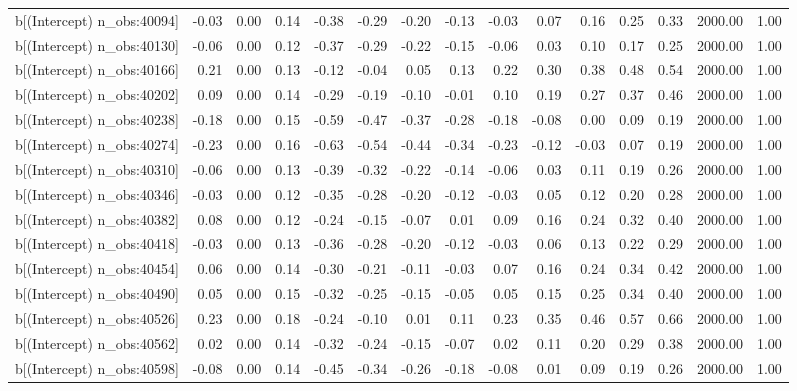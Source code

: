 \begin{table}[ht]
\begin{tabular}{rrrrrrrrrrrrrrr}
  b[(Intercept) n\_obs:40094] & -0.03 & 0.00 & 0.14 & -0.38 & -0.29 & -0.20 & -0.13 & -0.03 & 0.07 & 0.16 & 0.25 & 0.33 & 2000.00 & 1.00 \\ 
  b[(Intercept) n\_obs:40130] & -0.06 & 0.00 & 0.12 & -0.37 & -0.29 & -0.22 & -0.15 & -0.06 & 0.03 & 0.10 & 0.17 & 0.25 & 2000.00 & 1.00 \\ 
  b[(Intercept) n\_obs:40166] & 0.21 & 0.00 & 0.13 & -0.12 & -0.04 & 0.05 & 0.13 & 0.22 & 0.30 & 0.38 & 0.48 & 0.54 & 2000.00 & 1.00 \\ 
  b[(Intercept) n\_obs:40202] & 0.09 & 0.00 & 0.14 & -0.29 & -0.19 & -0.10 & -0.01 & 0.10 & 0.19 & 0.27 & 0.37 & 0.46 & 2000.00 & 1.00 \\ 
  b[(Intercept) n\_obs:40238] & -0.18 & 0.00 & 0.15 & -0.59 & -0.47 & -0.37 & -0.28 & -0.18 & -0.08 & 0.00 & 0.09 & 0.19 & 2000.00 & 1.00 \\ 
  b[(Intercept) n\_obs:40274] & -0.23 & 0.00 & 0.16 & -0.63 & -0.54 & -0.44 & -0.34 & -0.23 & -0.12 & -0.03 & 0.07 & 0.19 & 2000.00 & 1.00 \\ 
  b[(Intercept) n\_obs:40310] & -0.06 & 0.00 & 0.13 & -0.39 & -0.32 & -0.22 & -0.14 & -0.06 & 0.03 & 0.11 & 0.19 & 0.26 & 2000.00 & 1.00 \\ 
  b[(Intercept) n\_obs:40346] & -0.03 & 0.00 & 0.12 & -0.35 & -0.28 & -0.20 & -0.12 & -0.03 & 0.05 & 0.12 & 0.20 & 0.28 & 2000.00 & 1.00 \\ 
  b[(Intercept) n\_obs:40382] & 0.08 & 0.00 & 0.12 & -0.24 & -0.15 & -0.07 & 0.01 & 0.09 & 0.16 & 0.24 & 0.32 & 0.40 & 2000.00 & 1.00 \\ 
  b[(Intercept) n\_obs:40418] & -0.03 & 0.00 & 0.13 & -0.36 & -0.28 & -0.20 & -0.12 & -0.03 & 0.06 & 0.13 & 0.22 & 0.29 & 2000.00 & 1.00 \\ 
  b[(Intercept) n\_obs:40454] & 0.06 & 0.00 & 0.14 & -0.30 & -0.21 & -0.11 & -0.03 & 0.07 & 0.16 & 0.24 & 0.34 & 0.42 & 2000.00 & 1.00 \\ 
  b[(Intercept) n\_obs:40490] & 0.05 & 0.00 & 0.15 & -0.32 & -0.25 & -0.15 & -0.05 & 0.05 & 0.15 & 0.25 & 0.34 & 0.40 & 2000.00 & 1.00 \\ 
  b[(Intercept) n\_obs:40526] & 0.23 & 0.00 & 0.18 & -0.24 & -0.10 & 0.01 & 0.11 & 0.23 & 0.35 & 0.46 & 0.57 & 0.66 & 2000.00 & 1.00 \\ 
  b[(Intercept) n\_obs:40562] & 0.02 & 0.00 & 0.14 & -0.32 & -0.24 & -0.15 & -0.07 & 0.02 & 0.11 & 0.20 & 0.29 & 0.38 & 2000.00 & 1.00 \\ 
  b[(Intercept) n\_obs:40598] & -0.08 & 0.00 & 0.14 & -0.45 & -0.34 & -0.26 & -0.18 & -0.08 & 0.01 & 0.09 & 0.19 & 0.26 & 2000.00 & 1.00 \\ 

\end{tabular}
\end{table}
